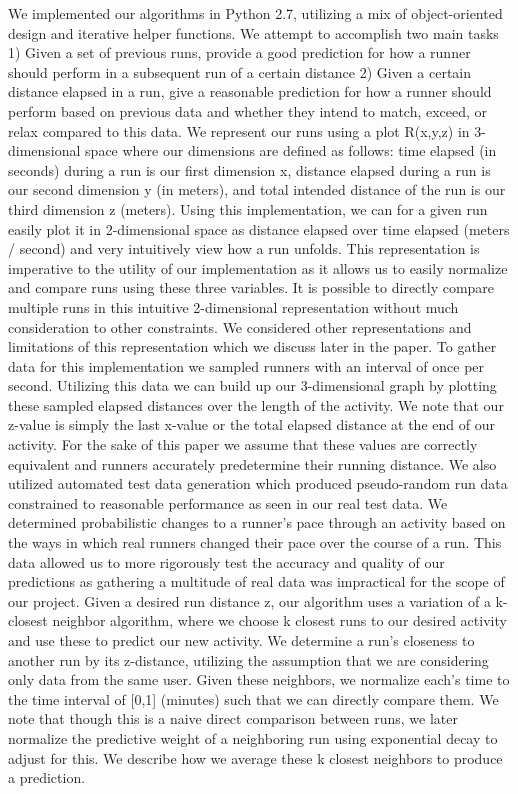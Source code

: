 \documentclass[twoside]{article}
\begin{document}
\begin{multicols}{2}
\indent We implemented our algorithms in Python 2.7, utilizing a mix of object-oriented design and iterative helper functions. We attempt to accomplish two main tasks 1) Given a set of previous runs, provide a good prediction for how a runner should perform in a subsequent run of a certain distance 2) Given a certain distance elapsed in a run, give a reasonable prediction for how a runner should perform based on previous data and whether they intend to match, exceed, or relax compared to this data. We represent our runs using a plot R(x,y,z) in 3-dimensional space where our dimensions are defined as follows: time elapsed (in seconds) during a run is our first dimension x, distance elapsed during a run is our second dimension y (in meters), and total intended distance of the run is our third dimension z (meters). Using this implementation, we can for a given run easily plot it in 2-dimensional space as distance elapsed over time elapsed (meters / second) and very intuitively view how a run unfolds. This representation is imperative to the utility of our implementation as it allows us to easily normalize and compare runs using these three variables.  It is possible to directly compare multiple runs in this intuitive 2-dimensional representation without much consideration to other constraints. We considered other representations and limitations of this representation which we discuss later in the paper.
	To gather data for this implementation we sampled runners with an interval of once per second. Utilizing this data we can build up our 3-dimensional graph by plotting these sampled elapsed distances over the length of the activity. We note that our z-value is simply the last x-value or the total elapsed distance at the end of our activity.  For the sake of this paper we assume that these values are correctly equivalent and runners accurately predetermine their running distance. We also utilized automated test data generation which produced pseudo-random run data constrained to reasonable performance as seen in our real test data.  We determined probabilistic changes to a runner’s pace through an activity based on the ways in which real runners changed their pace over the course of a run. This data allowed us to more rigorously test the accuracy and quality of our predictions as gathering a multitude of real data was impractical for the scope of our project.
	Given a desired run distance z, our algorithm uses a variation of a k-closest neighbor algorithm, where we choose k closest runs to our desired activity and use these to predict our new activity.  We determine a run’s closeness to another run by its z-distance, utilizing the assumption that we are considering only data from the same user.  Given these neighbors, we normalize each’s time to the time interval of [0,1] (minutes) such that we can directly compare them. We note that though this is a naive direct comparison between runs, we later normalize the predictive weight of a neighboring run using exponential decay to adjust for this.  We describe how we average these k closest neighbors to produce a prediction.

\end{multicols}
\end{document}
